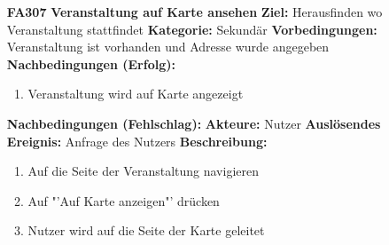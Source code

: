 \documentclass[parskip=full]{scrartcl}
\begin{document}
\begin{itemize}[nosep]
			\item[\textbf{FA307}]\textbf{Veranstaltung auf Karte ansehen} \label{sec:FA307}	
			\newline \textbf{Ziel:} Herausfinden wo Veranstaltung stattfindet
			\newline \textbf{Kategorie:} Sekundär
			\newline \textbf{Vorbedingungen:} Veranstaltung ist vorhanden und Adresse wurde angegeben
			\newline \textbf{Nachbedingungen (Erfolg):} 
			\begin{enumerate}[nosep]
				\item Veranstaltung wird auf Karte angezeigt
			\end{enumerate}
			\textbf{Nachbedingungen (Fehlschlag):}
			\newline \textbf{Akteure:} Nutzer
			\newline \textbf{Auslösendes Ereignis:} Anfrage des Nutzers
			\newline \textbf{Beschreibung:}
			\begin{enumerate}[nosep]
				\item Auf die Seite der Veranstaltung navigieren
				\item Auf "'Auf Karte anzeigen"' drücken
				\item Nutzer wird auf die Seite der Karte geleitet\\
			\end{enumerate}
			
			
		\end{itemize}
		
\end{document}
